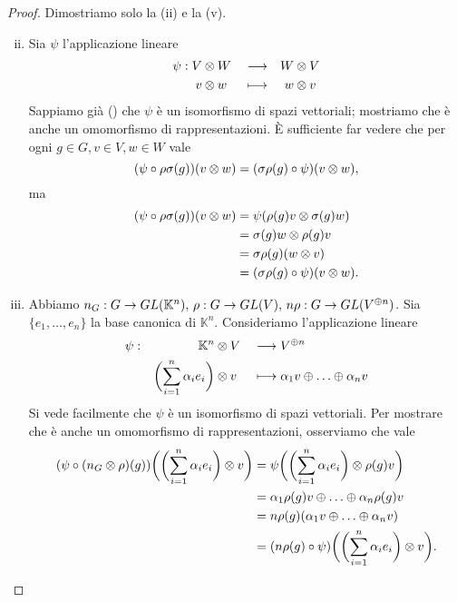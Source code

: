 \begin{proof}
Dimostriamo solo la (ii) e la (v).
\begin{enumerate}[(i)]
\setcounter{enumi}{1}
\item Sia $\psi$ l'applicazione lineare
\begin{alignat*}{3}
\psi:V&\otimes W&&\longrightarrow &W&\otimes V\\
v&\otimes w&&\longmapsto &w&\otimes v
\end{alignat*}
Sappiamo già () che $\psi$ è un isomorfismo di spazi vettoriali; mostriamo che è anche un omomorfismo di rappresentazioni. È sufficiente far vedere che per ogni $g\in G\comma v\in V\comma w\in W$ vale
$$
(\psi\circ\rho\sigma(g))(v\otimes w)=(\sigma\rho(g)\circ\psi)(v\otimes w),
$$
ma
\begin{align*}
(\psi\circ\rho\sigma(g))(v\otimes w)&=\psi(\rho(g)v\otimes\sigma(g)w)\\
&=\sigma(g)w\otimes\rho(g)v\\
&=\sigma\rho(g)(w\otimes v)\\
&=(\sigma\rho(g)\circ\psi)(v\otimes w).
\end{align*}

\setcounter{enumi}{4}
\item Abbiamo $n_G:G\to GL(\mathbb{K}^n),\,\allowbreak\rho:G\to GL(V),\,\allowbreak n\rho:G\to GL(V^{\oplus n})$. Sia $\{e_1,\ldots,e_n\}$ la base canonica di $\mathbb{K}^n$. Consideriamo l'applicazione lineare
\begin{alignat*}{3}
\psi:&&\mathbb{K}^n&\otimes V&&\longrightarrow V^{\oplus n}\\
&&\biggl(\sum_{i=1}^{n}\alpha_ie_i\biggr)&\otimes v&&\longmapsto\alpha_1v\oplus\ldots\oplus\alpha_nv
\end{alignat*}
Si vede facilmente che $\psi$ è un isomorfismo di spazi vettoriali. Per mostrare che è anche un omomorfismo di rappresentazioni, osserviamo che vale
\begin{align*}
(\psi\circ(n_G\otimes\rho)(g))\biggl(\biggl(\sum_{i=1}^{n}\alpha_ie_i\biggr)\otimes v\biggr)
&=\psi\biggl(\biggl(\sum_{i=1}^{n}\alpha_ie_i\biggr)\otimes\rho(g)v\biggr)\\
&=\alpha_1\rho(g)v\oplus\ldots\oplus\alpha_n\rho(g)v\\
&=n\rho(g)(\alpha_1v\oplus\ldots\oplus\alpha_nv)\\
&=(n\rho(g)\circ\psi)\biggl(\biggl(\sum_{i=1}^{n}\alpha_ie_i\biggr)\otimes v\biggr).
\end{align*}
\end{enumerate}
\end{proof}

